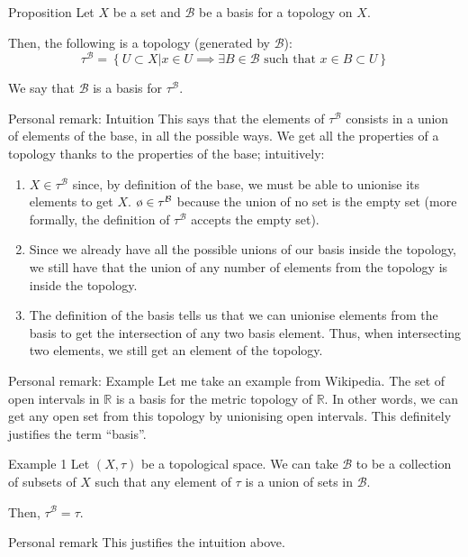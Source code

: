 \documentclass[a4paper]{article}
\begin{document}
\begin{parag}{Proposition}
    Let $X$ be a set and $\mathcal{B}$ be a basis for a topology on $X$.

    Then, the following is a topology (generated by $\mathcal{B}$):
    \[\tau^{\mathcal{B}} = \left\{U \subset X | x \in U \implies \exists B \in \mathcal{B} \text{ such that } x \in B \subset U\right\}\]

    We say that $\mathcal{B}$ is a basis for $\tau^{\mathcal{B}}$.

    \begin{subparag}{Personal remark: Intuition}
        This says that the elements of $\tau^\mathcal{B}$ consists in a union of elements of the base, in all the possible ways. We get all the properties of a topology thanks to the properties of the base; intuitively:
        \begin{enumerate}
            \item $X \in \tau^{\mathcal{B}}$ since, by definition of the base, we must be able to unionise its elements to get $X$. $\o \in \tau^{\mathcal{B}}$ because the union of no set is the empty set (more formally, the definition of $\tau^\mathcal{B}$ accepts the empty set).
            \item Since we already have all the possible unions of our basis inside the topology, we still have that the union of any number of elements from the topology is inside the topology.
            \item The definition of the basis tells us that we can unionise elements from the basis to get the intersection of any two basis element. Thus, when intersecting two elements, we still get an element of the topology.
        \end{enumerate}
    \end{subparag}

    \begin{subparag}{Personal remark: Example}
        Let me take an example from Wikipedia. The set of open intervals in $\mathbb{R}$ is a basis for the metric topology of $\mathbb{R}$. In other words, we can get any open set from this topology by unionising open intervals. This definitely justifies the term ``basis''.
    \end{subparag}
\end{parag}

\begin{parag}{Example 1}
    Let $\left(X, \tau\right)$ be a topological space. We can take $\mathcal{B}$ to be a collection of subsets of $X$ such that any element of $\tau$ is a union of sets in $\mathcal{B}$.

    Then, $\tau^{\mathcal{B}} = \tau$.

    \begin{subparag}{Personal remark}
        This justifies the intuition above.
    \end{subparag}
\end{parag}
\end{document}
